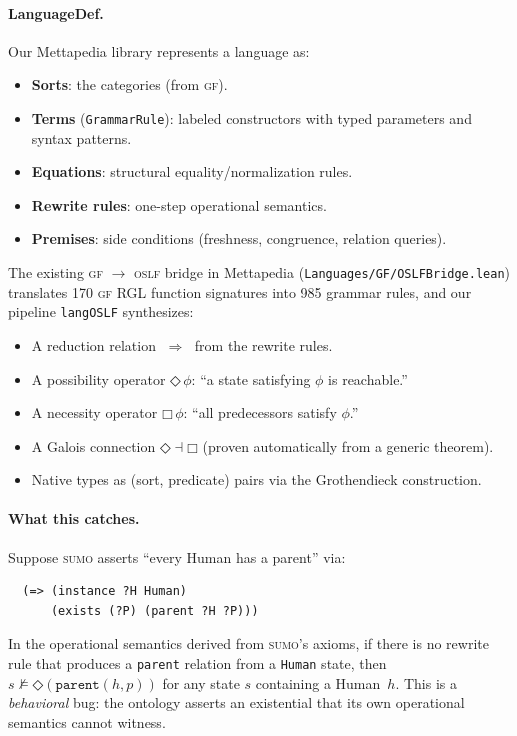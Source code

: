 \documentclass[11pt]{article}
\newcommand{\DiamondOp}{\mathbin{\Diamond}}
\newcommand{\BoxOp}{\mathbin{\Box}}
\newcommand{\Red}{\;\Rightarrow\;}
\newcommand{\SUMO}{\textsc{sumo}}
\newcommand{\GF}{\textsc{gf}}
\newcommand{\OSLF}{\textsc{oslf}}
\theoremstyle{definition}
\theoremstyle{plain}
\begin{document}
\paragraph{LanguageDef.}
Our Mettapedia library represents a language as:
\begin{itemize}[nosep]
  \item \textbf{Sorts}: the categories (from \GF{}).
  \item \textbf{Terms} (\texttt{GrammarRule}): labeled constructors
    with typed parameters and syntax patterns.
  \item \textbf{Equations}: structural equality/normalization rules.
  \item \textbf{Rewrite rules}: one-step operational semantics.
  \item \textbf{Premises}: side conditions (freshness, congruence,
    relation queries).
\end{itemize}

The existing \GF{} $\to$ \OSLF{} bridge in Mettapedia
(\texttt{Languages/GF/OSLFBridge.lean}) translates 170 \GF{} RGL
function signatures into 985 grammar rules, and our pipeline
\texttt{langOSLF} synthesizes:
\begin{itemize}[nosep]
  \item A reduction relation $\Red$ from the rewrite rules.
  \item A possibility operator $\DiamondOp\,\phi$: ``a state satisfying
    $\phi$ is reachable.''
  \item A necessity operator $\BoxOp\,\phi$: ``all predecessors satisfy
    $\phi$.''
  \item A Galois connection $\DiamondOp \dashv \BoxOp$ (proven
    automatically from a generic theorem).
  \item Native types as (sort, predicate) pairs via the Grothendieck
    construction.
\end{itemize}

\paragraph{What this catches.}
Suppose \SUMO{} asserts ``every Human has a parent'' via:
\begin{verbatim}
  (=> (instance ?H Human)
      (exists (?P) (parent ?H ?P)))
\end{verbatim}
In the operational semantics derived from \SUMO{}'s axioms, if there
is no rewrite rule that produces a \texttt{parent} relation from a
\texttt{Human} state, then $s \not\models \DiamondOp(\texttt{parent}(h, p))$
for any state $s$ containing a Human~$h$.
This is a \emph{behavioral} bug: the ontology asserts an existential
that its own operational semantics cannot witness.
\end{document}
